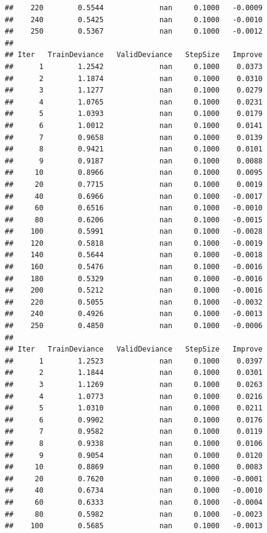 \documentclass[]{book}
\begin{document}
\begin{verbatim}
##    220        0.5544             nan     0.1000   -0.0009
##    240        0.5425             nan     0.1000   -0.0010
##    250        0.5367             nan     0.1000   -0.0012
## 
## Iter   TrainDeviance   ValidDeviance   StepSize   Improve
##      1        1.2542             nan     0.1000    0.0373
##      2        1.1874             nan     0.1000    0.0310
##      3        1.1277             nan     0.1000    0.0279
##      4        1.0765             nan     0.1000    0.0231
##      5        1.0393             nan     0.1000    0.0179
##      6        1.0012             nan     0.1000    0.0141
##      7        0.9658             nan     0.1000    0.0139
##      8        0.9421             nan     0.1000    0.0101
##      9        0.9187             nan     0.1000    0.0088
##     10        0.8966             nan     0.1000    0.0095
##     20        0.7715             nan     0.1000    0.0019
##     40        0.6966             nan     0.1000   -0.0017
##     60        0.6516             nan     0.1000   -0.0010
##     80        0.6206             nan     0.1000   -0.0015
##    100        0.5991             nan     0.1000   -0.0028
##    120        0.5818             nan     0.1000   -0.0019
##    140        0.5644             nan     0.1000   -0.0018
##    160        0.5476             nan     0.1000   -0.0016
##    180        0.5329             nan     0.1000   -0.0016
##    200        0.5212             nan     0.1000   -0.0016
##    220        0.5055             nan     0.1000   -0.0032
##    240        0.4926             nan     0.1000   -0.0013
##    250        0.4850             nan     0.1000   -0.0006
## 
## Iter   TrainDeviance   ValidDeviance   StepSize   Improve
##      1        1.2523             nan     0.1000    0.0397
##      2        1.1844             nan     0.1000    0.0301
##      3        1.1269             nan     0.1000    0.0263
##      4        1.0773             nan     0.1000    0.0216
##      5        1.0310             nan     0.1000    0.0211
##      6        0.9902             nan     0.1000    0.0176
##      7        0.9582             nan     0.1000    0.0119
##      8        0.9338             nan     0.1000    0.0106
##      9        0.9054             nan     0.1000    0.0120
##     10        0.8869             nan     0.1000    0.0083
##     20        0.7620             nan     0.1000   -0.0001
##     40        0.6734             nan     0.1000   -0.0010
##     60        0.6333             nan     0.1000   -0.0004
##     80        0.5982             nan     0.1000   -0.0023
##    100        0.5685             nan     0.1000   -0.0013

\end{verbatim}
\end{document}

